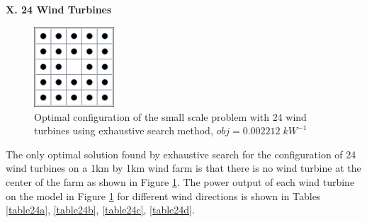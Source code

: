     \textbf{X. 24 Wind Turbines}
        \begin{figure}[H]
            \centering
            \includegraphics[width=3cm]{Figures/Chromosomes/24.png}
            \caption{Optimal configuration of the small scale problem with 24 wind turbines using exhaustive search method, $obj=0.002212\;kW^{-1}$}
            \label{small24}
        \end{figure}
        
        The only optimal solution found by exhaustive search for the configuration of 24 wind turbines on a 1km by 1km wind farm is that there is no wind turbine at the center of the farm as shown in Figure \ref{small24}. The power output of each wind turbine on the model in Figure \ref{small24} for different wind directions is shown in Tables \ref{table24a}, \ref{table24b}, \ref{table24c}, \ref{table24d}.
        
